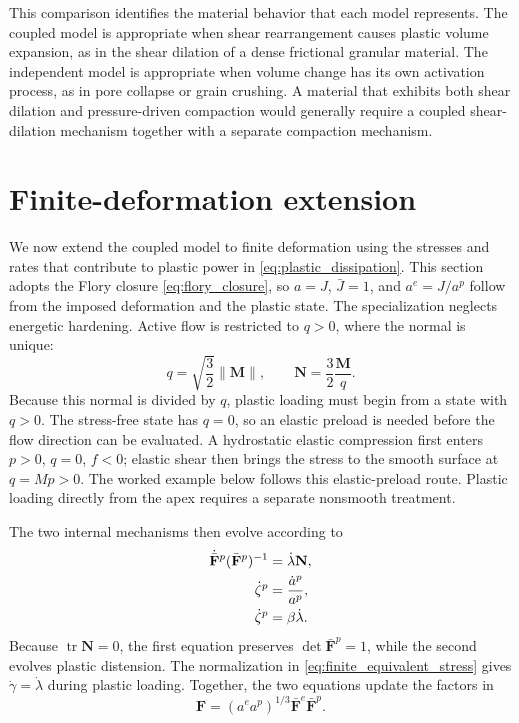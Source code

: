 \documentclass[11pt]{article}
\newcommand{\mbf}[1]{\mathbf{#1}}
\newcommand{\tr}{\operatorname{tr}}
\begin{document}
This comparison identifies the material behavior that each model represents.
The coupled model is appropriate when shear rearrangement causes plastic volume
expansion, as in the shear dilation of a dense frictional granular material.
The independent model is appropriate when volume change has its own activation
process, as in pore collapse or grain crushing.  A material that exhibits both
shear dilation and pressure-driven compaction would generally require a coupled
shear-dilation mechanism together with a separate compaction mechanism.

\section{Finite-deformation extension}
\label{sec:finite_lift}

We now extend the coupled model to finite deformation using the stresses and
rates that contribute to plastic power in
\eqref{eq:plastic_dissipation}.  This section adopts
the Flory closure \eqref{eq:flory_closure}, so \(a=J\),
\(\bar J=1\), and \(a^e=J/a^p\) follow from the imposed deformation
and the plastic state.  The specialization neglects energetic hardening.
Active flow is restricted to \(q>0\), where the normal is unique:
\begin{equation}
	q=\sqrt{\frac{3}{2}}\lVert\mbf M\rVert,
	\qquad
	\mbf N=\frac{3}{2}\frac{\mbf M}{q}.
	\label{eq:finite_equivalent_stress}
\end{equation}
Because this normal is divided by \(q\), plastic loading must begin from a
state with \(q>0\). The stress-free state has \(q=0\), so an elastic preload is
needed before the flow direction can be evaluated. A hydrostatic elastic
compression first enters \(p>0\), \(q=0\), \(f<0\); elastic shear then brings
the stress to the smooth surface at \(q=Mp>0\). The worked example below
follows this elastic-preload route. Plastic loading directly from the apex
requires a separate nonsmooth treatment.

The two internal mechanisms then evolve according to
\begin{subequations}
	\label{eq:finite_flow_rules}
	\begin{align}
		\dot{\bar{\mbf F}}^{p}(\bar{\mbf F}^{p})^{-1}
		 & =\dot\lambda\mbf N,
		\label{eq:finite_true_flow}      \\
		\dot\zeta^p
		 & =\frac{\dot a^p}{a^p}, \notag \\
		\dot\zeta^p
		 & =\beta\dot\lambda.
		\label{eq:finite_distension_flow}
	\end{align}
\end{subequations}
Because \(\tr\mbf N=0\), the first equation preserves
\(\det\bar{\mbf F}^{p}=1\), while the second evolves plastic distension.
The normalization in \eqref{eq:finite_equivalent_stress} gives
\(\dot\gamma=\dot\lambda\) during plastic loading.
Together, the two equations update the factors in
\begin{equation*}
	\mbf F
	=\left(a^e a^p\right)^{1/3}
	\bar{\mbf F}^{e}\bar{\mbf F}^{p}.
\end{equation*}
\end{document}
